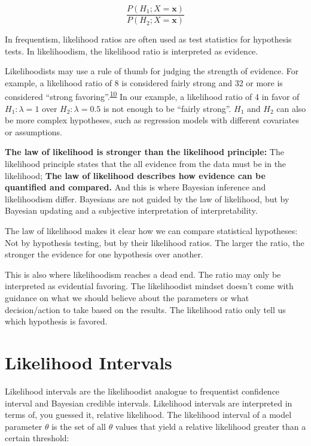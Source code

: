\documentclass[
  10pt,
]{scrbook}
\begin{document}
\[\frac{P(H_1;X = \mathbf{x})}{P(H_2;X = \mathbf{x})}\]

In frequentism, likelihood ratios are often used as test statistics for hypothesis tests.
In likelihoodism, the likelihood ratio is interpreted as evidence.

Likelihoodists may use a rule of thumb for judging the strength of evidence.
For example, a likelihood ratio of 8 is considered fairly strong and 32 or more is considered ``strong favoring''.\textsuperscript{\protect\hyperlink{ref-richard2017statistical}{10}}
In our example, a likelihood ratio of 4 in favor of \(H_1: \lambda = 1\) over \(H_2: \lambda = 0.5\) is not enough to be ``fairly strong''.
\(H_1\) and \(H_2\) can also be more complex hypotheses, such as regression models with different covariates or assumptions.

\textbf{The law of likelihood is stronger than the likelihood principle:}
The likelihood principle states that the all evidence from the data must be in the likelihood;
\textbf{The law of likelihood describes how evidence can be quantified and compared.}
And this is where Bayesian inference and likelihoodism differ.
Bayesians are not guided by the law of likelihood, but by Bayesian updating and a subjective interpretation of interpretability.

The law of likelihood makes it clear how we can compare statistical hypotheses:
Not by hypothesis testing, but by their likelihood ratios.
The larger the ratio, the stronger the evidence for one hypothesis over another.

This is also where likelihoodism reaches a dead end.
The ratio may only be interpreted as evidential favoring.
The likelihoodist mindset doesn't come with guidance on what we should believe about the parameters or what decision/action to take based on the results.
The likelihood ratio only tell us which hypothesis is favored.

\hypertarget{likelihood-intervals}{%
\section{Likelihood Intervals}\label{likelihood-intervals}}

Likelihood intervals are the likelihoodist analogue to frequentist confidence interval and Bayesian credible intervals.
Likelihood intervals are interpreted in terms of, you guessed it, relative likelihood.
The likelihood interval of a model parameter \(\theta\) is the set of all \(\theta\) values that yield a relative likelihood greater than a certain threshold:
\end{document}
